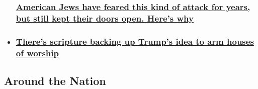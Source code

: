 \begin{itemize}
{  \subsubsection{\texorpdfstring{\href{/2018/10/29/us/pittsburgh-synagogue-shooting-jewish-values/index.html}{American
  Jews have feared this kind of attack for years, but still kept their
  doors open. Here's
  why}}{American Jews have feared this kind of attack for years, but still kept their doors open. Here's why}}\label{american-jews-have-feared-this-kind-of-attack-for-years-but-still-kept-their-doors-open-heres-why}}
\item
  \hypertarget{theres-scripture-backing-up-trumps-idea-to-arm-houses-of-worship}{%
  \subsubsection{\texorpdfstring{\href{/2018/10/28/us/arming-houses-of-worship/index.html}{There's
  scripture backing up Trump's idea to arm houses of
  worship}}{There's scripture backing up Trump's idea to arm houses of worship}}\label{theres-scripture-backing-up-trumps-idea-to-arm-houses-of-worship}}
\end{itemize}

\hypertarget{around-the-nation-}{%
\subsection{Around the Nation~}\label{around-the-nation-}}

